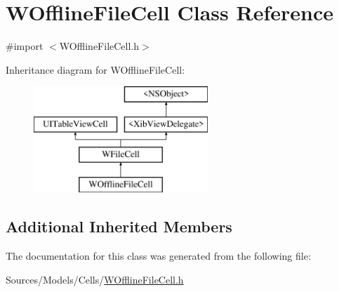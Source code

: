 \hypertarget{interface_w_offline_file_cell}{\section{W\-Offline\-File\-Cell Class Reference}
\label{interface_w_offline_file_cell}
}


{\ttfamily \#import $<$W\-Offline\-File\-Cell.\-h$>$}

Inheritance diagram for W\-Offline\-File\-Cell\-:\begin{figure}[H]
\begin{center}
\leavevmode
\includegraphics[height=4.000000cm]{interface_w_offline_file_cell}
\end{center}
\end{figure}
\subsection*{Additional Inherited Members}


The documentation for this class was generated from the following file\-:\begin{DoxyCompactItemize}
\item 
Sources/\-Models/\-Cells/\hyperlink{_w_offline_file_cell_8h}{W\-Offline\-File\-Cell.\-h}\end{DoxyCompactItemize}
